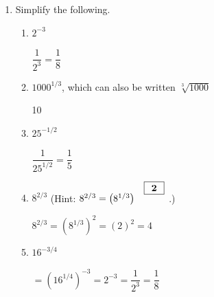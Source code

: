 \documentclass{article}
\begin{document}
\begin{enumerate}
\begin{itemize}
  \item $a^{1/n}$ is the positive number that, when raised to the power $n$, results in $\fitb{0.25in}{a}$. This is called the \uline{$n$-th root of $a$} and can also be written as $\sqrt[n]{a}$.

  \end{itemize}

  \pspace{\newpage}

\item  Simplify the following. 

  \begin{enumerate}
  \item
    \begin{problem}
      $2^{-3}$
    \end{problem}
    \begin{solution}
        $\dfrac{1}{2^3}=\dfrac{1}{8}$
    \end{solution}

  \item
    \begin{problem}
      $1000^{1/3}$, which can also be written $\sqrt[3]{1000}$
    \end{problem}
    \begin{solution}
        10
    \end{solution}

  \item
    \begin{problem}
      $25^{-1/2}$
    \end{problem}
    \begin{solution}
       $\dfrac{1}{25^{1/2}}=\dfrac{1}{5}$
    \end{solution}

  \item
    \begin{problem}
      $8^{2/3}$ (Hint: $8^{2/3} = \left( 8^{1/3} \right)^{\raisebox{1ex}{\cfitbox[\vphantom{1}]{0.2in}{$\bm{2}$}}}$.)
    \end{problem}
    \begin{solution}
        $8^{2/3}=(8^{1/3})^2=(2)^2=4$
    \end{solution}

  \item
    \begin{problem}
      $16^{-3/4}$
    \end{problem}
    \begin{solution}
        $=(16^{1/4})^{-3}=2^{-3}=\dfrac{1}{2^3}=\dfrac{1}{8}$
    \end{solution}
  \end{enumerate}


\end{enumerate}
\end{document}
